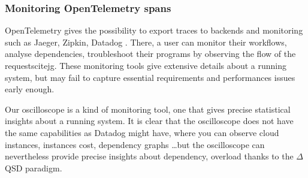     \subsubsection{Monitoring OpenTelemetry spans}
            OpenTelemetry gives the possibility to export traces to backends and monitoring such as Jaeger, Zipkin, Datadog \cite{otel-exp}. There, a user can monitor their workflows, analyse dependencies, troubleshoot their programs by observing the flow of the requestscite{jg}. These monitoring tools give extensive details about a running system, but may fail to capture essential requirements and performances issues early enough.
        
        Our oscilloscope is a kind of monitoring tool, one that gives precise statistical insights about a running system. It is clear that the oscilloscope does not have the same capabilities as Datadog \cite{datadog} might have, where you can observe cloud instances, instances cost, dependency graphs \dots but the oscilloscope can nevertheless provide precise insights about dependency, overload thanks to the $\Delta$QSD paradigm. 

